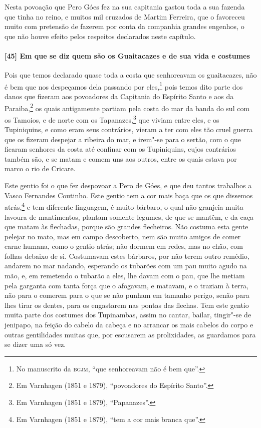 \begin{linenumbers}
Nesta povoação que Pero Góes fez na sua capitania gastou toda a sua fazenda que tinha no
reino, e muitos mil cruzados de Martim Ferreira, que o favoreceu muito com pretensão de
fazerem por conta da companhia grandes engenhos, o que não houve efeito pelos respeitos
declarados neste capítulo.

\paragraph{[45] Em que se diz quem são os Guaitacazes e de sua vida e costumes} \quad
Pois que temos declarado quase toda a costa que senhoreavam os guaitacazes, não é bem que
nos despeçamos dela passando por eles,\footnote{ No manuscrito da \textsc{bgjm}, ``que
senhoreavam não é bem que''.} pois temos dito parte dos danos que fizeram aos povoadores
da Capitania do Espírito Santo e aos da Paraiba,\footnote{ Em Varnhagen (1851 e 1879),
``povoadores do Espírito Santo''.} os quais antigamente partiam pela costa do mar da banda
do sul com os Tamoios, e de norte com os Tapanazes,\footnote{ Em Varnhagen (1851 e 1879),
``Papanazes''.} que viviam entre eles, e os Tupiniquins, e como eram seus contrários,
vieram a ter com eles tão cruel guerra que os fizeram despejar a ribeira do mar, e irem"-se
para o sertão, com o que ficaram senhores da costa até confinar com os Tupiniquins, cujos
contrários também são, e se matam e comem uns aos outros, entre os quais estava por marco
o rio de Cricare.

Este gentio foi o que fez despovoar a Pero de Góes, e que deu tantos trabalhos a Vasco
Fernandes Coutinho. Este gentio tem a cor mais baça que os que dissemos atrás,\footnote{
Em Varnhagen (1851 e 1879), ``tem a cor mais branca que''.} e tem diferente linguagem, é
muito bárbaro, o qual não granjeia muita lavoura de mantimentos, plantam somente legumes,
de que se mantêm, e da caça que matam às flechadas, porque são grandes flecheiros. Não
costuma esta gente pelejar no mato, mas em campo descoberto, nem são muito amigos de comer
carne humana, como o gentio atrás; não dormem em redes, mas no chão, com folhas debaixo de
si. Costumavam estes bárbaros, por não terem outro remédio, andarem no mar nadando,
esperando os tubarões com um pau muito agudo na mão, e, em remetendo o tubarão a eles, lhe
davam com o pau, que lhe metiam pela garganta com tanta força que o afogavam, e matavam, e
o traziam à terra, não para o comerem para o que se não punham em tamanho perigo, senão
para lhes tirar os dentes, para os engastarem nas pontas das flechas. Tem este gentio
muita parte dos costumes dos Tupinambas, assim no cantar, bailar, tingir"-se de jenipapo,
na feição do cabelo da cabeça e no arrancar os mais cabelos do corpo e outras gentilidades
muitas que, por escusarem as prolixidades, as guardamos para se dizer uma só vez.


\end{linenumbers}
